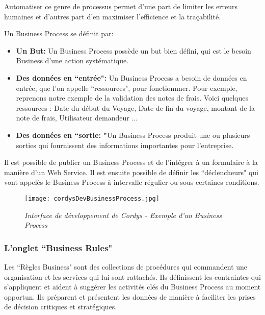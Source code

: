Automatiser ce genre de processus permet d'une part de limiter les erreurs humaines et d'autres part d'en maximiser l'efficience et la traçabilité.

Un Business Process se définit par:

\begin{itemize}\itemsep7pt

	\item \textbf{Un But: } Un Business Process possède un but bien défini, qui est le besoin Business d'une action systématique.
	
	\item \textbf{Des données en ``entrée": }Un Business Process a besoin de données en entrée, que l'on appelle ``ressources", pour fonctionnner. Pour exemple, reprenons notre exemple de la validation des notes de frais. Voici quelques ressources : Date du début du Voyage, Date de fin du voyage, montant de la note de frais, Utilisateur demandeur ...
	
	\item \textbf{Des données en ``sortie: "}Un Business Process produit une ou plusieurs sorties qui fournissent des informations importantes pour l'entreprise.
	
\end{itemize}

Il est possible de publier un Business Process et de l'intégrer à un formulaire à la manière d'un Web Service. Il est ensuite possible de définir les ``déclencheurs" qui vont appelés le Business Process à intervalle régulier ou sous certaines conditions.

\begin{figure}[H]
    \centering
    \texttt{[image: cordysDevBusinessProcess.jpg]}
	\caption{\textit{Interface de développement de Cordys - Exemple d'un Business Process}}\label{image.cordysDevFormsDef} 
\end{figure}

\clearpage

\subsubsection{L'onglet ``Business Rules"}

Les ``Règles Business" sont des collections de procédures qui commandent une organisation et les services qui lui sont rattachés. Ils définissent les contraintes qui s'appliquent et aident à suggérer les activités clés du Business Process au moment opportun. Ils préparent et présentent les données de manière à faciliter les prises de décision critiques et stratégiques. 


